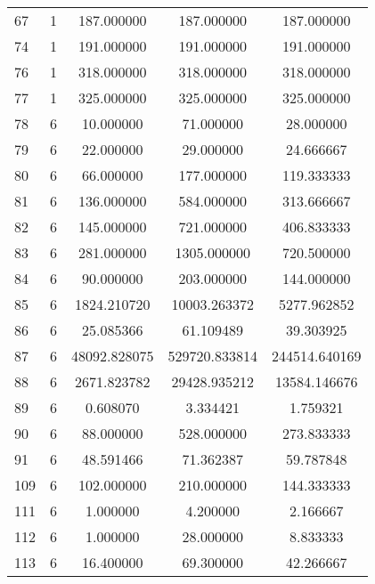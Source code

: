\documentclass[a4paper,12pt]{article}
\begin{document}
\begin{center}
\begin{longtable}{l S[table-format=3.0] S[table-format=8.2] S[table-format=8.2] S[table-format=8.2]}
          67   &   1   &   187.000000   &    187.000000     &     187.000000 \\
          74   &   1   &   191.000000   &    191.000000     &     191.000000 \\
          76   &   1   &   318.000000   &    318.000000     &     318.000000 \\
          77   &   1   &   325.000000   &    325.000000     &     325.000000 \\
          78   &   6   &    10.000000   &     71.000000     &      28.000000 \\
          79   &   6   &    22.000000   &     29.000000     &      24.666667 \\
          80   &   6   &    66.000000   &    177.000000     &     119.333333 \\
          81   &   6   &   136.000000   &    584.000000     &     313.666667 \\
          82   &   6   &   145.000000   &    721.000000     &     406.833333 \\
          83   &   6   &   281.000000   &   1305.000000     &     720.500000 \\
          84   &   6   &    90.000000   &    203.000000     &     144.000000 \\
          85   &   6   & 1824.210720   &   10003.263372     &    5277.962852 \\
          86   &   6   &   25.085366   &     61.109489     &      39.303925 \\
          87   &   6   & 48092.828075   &  529720.833814     &   244514.640169 \\
         88   &   6   & 2671.823782   &   29428.935212     &    13584.146676 \\
         89   &   6   &    0.608070   &      3.334421     &      1.759321 \\
         90   &   6   &   88.000000   &    528.000000     &     273.833333 \\
         91   &   6   &   48.591466   &     71.362387     &      59.787848 \\
        109   &   6   &  102.000000   &    210.000000     &     144.333333 \\
                111   &   6   &    1.000000   &      4.200000     &       2.166667 \\
        112   &   6   &    1.000000   &     28.000000     &       8.833333 \\
        113   &   6   &   16.400000   &     69.300000     &      42.266667 \\

\end{longtable}
\end{center}
\end{document}
